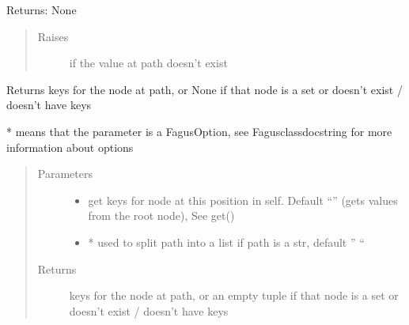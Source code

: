 \documentclass[a4paper,10pt,english]{sphinxmanual}
\begin{document}
\begin{fulllineitems}
\begin{fulllineitems}
\sphinxAtStartPar
Returns: None
\begin{quote}\begin{description}
\item[{Raises}] \leavevmode
\sphinxAtStartPar
{} \textendash{} if the value at path doesn’t exist

\end{description}\end{quote}

\end{fulllineitems}


\begin{fulllineitems}
\label{\detokenize{fagus:fagus.Fagus.keys}}
\pysigstartsignatures
{}
\pysigstopsignatures
\sphinxAtStartPar
Returns keys for the node at path, or None if that node is a set or doesn’t exist / doesn’t have keys

\sphinxAtStartPar
* means that the parameter is a FagusOption, see Fagus\sphinxhyphen{}class\sphinxhyphen{}docstring for more information about options
\begin{quote}\begin{description}
\item[{Parameters}] \leavevmode\begin{itemize}
\item {}
\sphinxAtStartPar
{} \textendash{} get keys for node at this position in self. Default “” (gets values from the root node), See get()

\item {}
\sphinxAtStartPar
{} \textendash{} * used to split path into a list if path is a str, default ” “

\end{itemize}

\item[{Returns}] \leavevmode
\sphinxAtStartPar
keys for the node at path, or an empty tuple if that node is a set or doesn’t exist / doesn’t have keys


\end{description}
\end{quote}
\end{fulllineitems}
\end{fulllineitems}
\end{document}
